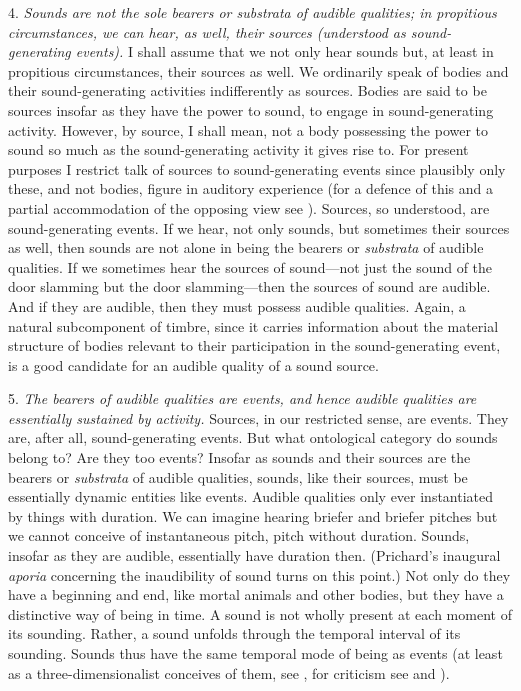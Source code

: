 \documentclass[12pt]{article}
\begin{document}
4. \emph{Sounds are not the sole bearers or \emph{substrata} of audible qualities; in propitious circumstances, we can hear, as well, their sources (understood as sound-generating events).} I shall assume that we not only hear sounds but, at least in propitious circumstances, their sources as well. We ordinarily speak of bodies and their sound-generating activities indifferently as sources. Bodies are said to be sources insofar as they have the power to sound, to engage in sound-generating activity. However, by source, I shall mean, not a body possessing the power to sound so much as the sound-generating activity it gives rise to. For present purposes I restrict talk of sources to sound-generating events since plausibly only these, and not bodies, figure in auditory experience (for a defence of this and a partial accommodation of the opposing view see \citealt[chapter 3.4]{Kalderon:2018oe}). Sources, so understood, are sound-generating events. If we hear, not only sounds, but sometimes their sources as well, then sounds are not alone in being the bearers or \emph{substrata} of audible qualities. If we sometimes hear the sources of sound---not just the sound of the door slamming but the door slamming---then the sources of sound are audible. And if they are audible, then they must possess audible qualities. Again, a natural subcomponent of timbre, since it carries information about the material structure of bodies relevant to their participation in the sound-generating event, is a good candidate for an audible quality of a sound source.

5. \emph{The bearers of audible qualities are events, and hence audible qualities are essentially sustained by activity.} Sources, in our restricted sense, are events. They are, after all, sound-generating events. But what ontological category do sounds belong to? Are they too events? Insofar as sounds and their sources are the bearers or \emph{substrata} of audible qualities, sounds, like their sources, must be essentially dynamic entities like events. Audible qualities only ever instantiated by things with duration. We can imagine hearing briefer and briefer pitches but we cannot conceive of instantaneous pitch, pitch without duration. Sounds, insofar as they are audible, essentially have duration then. (Prichard's \citeyear{Prichard:1950ly} inaugural \emph{aporia} concerning the inaudibility of sound turns on this point.) Not only do they have a beginning and end, like mortal animals and other bodies, but they have a distinctive way of being in time. A sound is not wholly present at each moment of its sounding. Rather, a sound unfolds through the temporal interval of its sounding. Sounds thus have the same temporal mode of being as events (at least as a three-dimensionalist conceives of them, see \citealt{Fine:2006fk}, for criticism see \citealt{Sider:1997fk} and \citealt{Hawthorne:2008uq}). 
\end{document}
